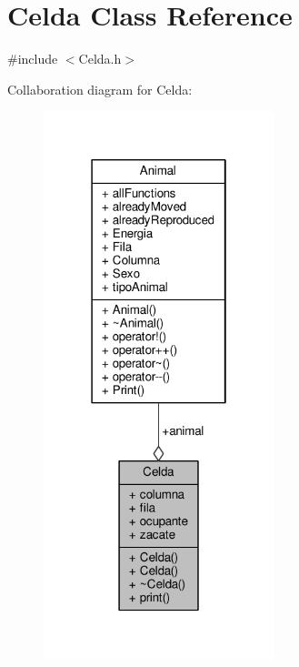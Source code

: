 \hypertarget{classCelda}{}\section{Celda Class Reference}
\label{classCelda}


{\ttfamily \#include $<$Celda.\+h$>$}



Collaboration diagram for Celda\+:\nopagebreak
\begin{figure}[H]
\begin{center}
\leavevmode
\includegraphics[width=190pt]{classCelda__coll__graph}
\end{center}
\end{figure}
